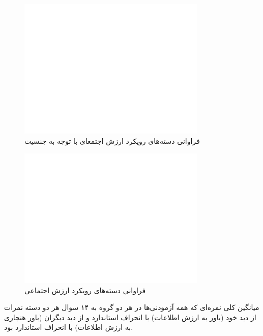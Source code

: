 \begin{figure}[htpb]
    \centering
    \includegraphics[width=0.8\textwidth]{./img/sexualityAndSVOAgainstPopulation.pdf}
    \caption{فراوانی دسته‌های رویکرد ارزش اجتمعای با توجه به جنسیت}
    \label{fig:sexualityAndSVOAgainstPopulation}
\end{figure}


\begin{figure}[htpb]
    \centering
    \includegraphics[width=0.8\textwidth]{./img/SVOAgainstPopulation.pdf}
    \caption{فراوانی دسته‌های رویکرد ارزش اجتماعی}
    \label{fig:SVOAgainstPopulation}
\end{figure}
میانگین کلی نمره‌ای که همه آزمودنی‌ها در هر دو گروه به ۱۴ سوال هر دو دسته
نمرات از دید خود
\!(باور به ارزش اطلاعات)
\meanOfSelfWTPAllTwoParticipantGroupsAllTwoQuestionSection
با انحراف استاندارد
\SDOfSelfWTPAllTwoParticipantGroupsAllTwoQuestionSection
و از دید دیگران
\meanOfOtherWTPAllTwoParticipantGroupsAllTwoQuestionSection
\!(باور هنجاری به ارزش اطلاعات)
با انحراف استاندارد
\SDOfOtherWTPAllTwoParticipantGroupsAllTwoQuestionSection
بود.


